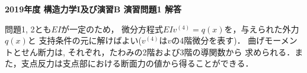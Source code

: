 \documentclass[10pt,a4j]{jarticle}
\newlength{\minitwocolumn}
\begin{document}
\newcommand{\fat}[1]{\mbox{\boldmath $#1$}}
\newcommand{\D}{\partial}
\newcommand{\w}{\omega}
\newcommand{\ga}{\alpha}
\newcommand{\gb}{\beta}
\newcommand{\gx}{\xi}
\newcommand{\gz}{\zeta}
\newcommand{\vhat}[1]{\hat{\fat{#1}}}
\newcommand{\spc}{\vspace{0.7\baselineskip}}
\newcommand{\halfspc}{\vspace{0.3\baselineskip}}

\pagestyle{empty}
\newcommand{\twofig}[2]
 {
   \begin{figure}[h]
     \begin{minipage}[t]{\minitwocolumn}
         \begin{center}   #1
         \end{center}
     \end{minipage}
         \hspace{\columnsep}
     \begin{minipage}[t]{\minitwocolumn}
         \begin{center} #2
         \end{center}
     \end{minipage}
   \end{figure}
 }
\begin{center}
{\Large \bf 2019年度 構造力学I及び演習B 演習問題1 解答} \\
\end{center}
問題1, 2とも$EI$が一定のため，
微分方程式$EIv^{(4)}=q(x)$を，与えられた外力$q(x)$と
支持条件の元に解けばよい($v^{(4)}$は$v$の4階微分を表す)．
曲げモーメントとせん断力は, それぞれ，たわみの2階および3階の導関数から
求められる．また，支点反力は支点部における断面力の値から得ることができる．
\end{document}
